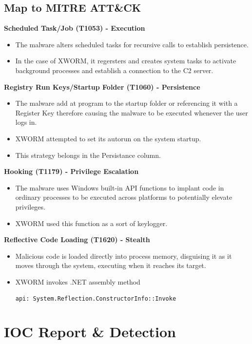 \documentclass[10pt]{article}
\begin{document}
\subsection{Map to MITRE ATT\&CK}
\textbf{Scheduled Task/Job (T1053) - Execution}
\begin{itemize}
	\item The malware alters scheduled tasks for recursive calls to establish persistence.
	\item In the case of XWORM, it regersters and creates system tasks to activate background processes and establish a connection to the C2 server.
\end{itemize}
\textbf{Registry Run Keys/Startup Folder (T1060) - Persistence}
\begin{itemize}
	\item The malware add at program to the startup folder or referencing it with a Register Key therefore causing the malware to be 
	executed whenever the user logs in.
	\item XWORM attempted to set its autorun on the system startup.
	\item This strategy belongs in the Persistance column.
\end{itemize}
\textbf{Hooking (T1179) - Privilege Escalation}
\begin{itemize}
	\item The malware uses Windows built-in API functions to implant code in ordinary processes to be executed across platforms to potentially
	elevate privileges.
	\item XWORM used this function as a sort of keylogger.
\end{itemize}
\textbf{Reflective Code Loading (T1620) - Stealth}
\begin{itemize}
	\item Malicious code is loaded directly into process memory, disguising it as it moves through the system, executing when it reaches its target.
	\item XWORM invokes .NET assembly method \begin{verifybox} \begin{center}\texttt{api: System.Reflection.ConstructorInfo::Invoke}\end{center} \end{verifybox}
\end{itemize}

\section{IOC Report \& Detection}
\end{document}

